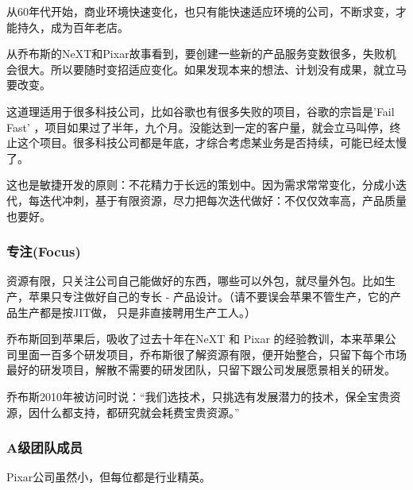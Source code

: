 从60年代开始，商业环境快速变化，也只有能快速适应环境的公司，不断求变，才能持久，成为百年老店。

从乔布斯的NeXT和Pixar故事看到，要创建一些新的产品服务变数很多，失败机会很大。所以要随时变招适应变化。如果发现本来的想法、计划没有成果，就立马要改变。

这道理适用于很多科技公司，比如谷歌也有很多失败的项目，谷歌的宗旨是'Fail
Fast'
，项目如果过了半年，九个月。没能达到一定的客户量，就会立马叫停，终止这个项目。很多科技公司都是年底，才综合考虑某业务是否持续，可能已经太慢了。

这也是敏捷开发的原则：不花精力于长远的策划中。因为需求常常变化，分成小迭代，每迭代冲刺，基于有限资源，尽力把每次迭代做好：不仅仅效率高，产品质量也要好。

\hypertarget{ux4e13ux6ce8focus}{%
\subsubsection{专注(Focus)}\label{ux4e13ux6ce8focus}}

资源有限，只关注公司自己能做好的东西，哪些可以外包，就尽量外包。比如生产，苹果只专注做好自己的专长
- 产品设计。（请不要误会苹果不管生产，它的产品生产都是按JIT做，
只是非直接聘用生产工人。）

乔布斯回到苹果后，吸收了过去十年在NeXT 和 Pixar
的经验教训，本来苹果公司里面一百多个研发项目，乔布斯很了解资源有限，便开始整合，只留下每个市场最好的研发项目，解散不需要的研发团队，只留下跟公司发展愿景相关的研发。

乔布斯2010年被访问时说：``我们选技术，只挑选有发展潜力的技术，保全宝贵资源，因什么都支持，都研究就会耗费宝贵资源。''

\hypertarget{aux7ea7ux56e2ux961fux6210ux5458}{%
\subsubsection{A级团队成员}\label{aux7ea7ux56e2ux961fux6210ux5458}}

Pixar公司虽然小，但每位都是行业精英。


